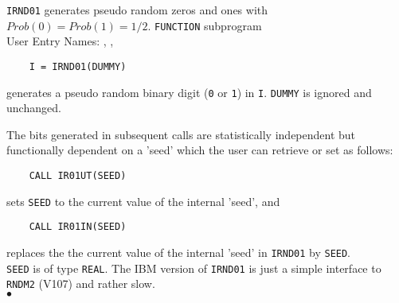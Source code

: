                        
                    
\Submitter{}                            
                    
{\tt IRND01} generates pseudo random zeros and ones with
$Prob(0)=Prob(1)=1/2$.
\Structure
{\tt FUNCTION} subprogram \\
User Entry Names: , , 
\Usage
\begin{verbatim}
    I = IRND01(DUMMY)
\end{verbatim}
generates a pseudo random binary digit ({\tt 0} or {\tt 1}) in
{\tt I}. {\tt DUMMY} is ignored and unchanged.
\par
The bits generated in subsequent calls are statistically independent but
functionally dependent on a 'seed' which the user can retrieve or set as
follows:
\begin{verbatim}
    CALL IR01UT(SEED)
\end{verbatim}
sets {\tt SEED} to the current value of the internal 'seed', and
\begin{verbatim}
    CALL IR01IN(SEED)
\end{verbatim}
replaces the the current value of the internal 'seed' in {\tt IRND01}
by {\tt SEED}. \\
{\tt SEED} is of type {\tt REAL}.
\Notes
The IBM version of {\tt IRND01} is just a simple interface to {\tt RNDM2}
(V107) and rather slow.
\\ $\bullet$
